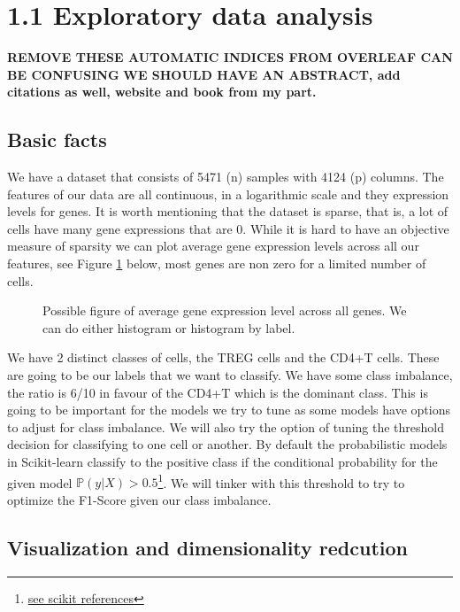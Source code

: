 \documentclass{article}
\begin{document}
\section{1.1 Exploratory data analysis}

\textbf{REMOVE THESE AUTOMATIC INDICES FROM OVERLEAF CAN BE CONFUSING}
\textbf{WE SHOULD HAVE AN ABSTRACT, add citations as well, website and book from my part.}


\subsection{Basic facts}
We have a dataset that consists of 5471 (n) samples with 4124 (p) columns. The features of our data are all continuous, in a logarithmic scale and they expression levels 
for genes. It is worth mentioning that the dataset is sparse, that is, a lot of cells have many gene expressions that are 0. While it is hard to have an objective measure
of sparsity we can plot average gene expression levels across all our features, see Figure \ref{fig:hist_sparse} below, most genes are non zero for a limited number of cells.

\begin{figure}[h]

    
    \caption{Possible figure of average gene expression level across all genes. We can do either histogram or histogram by label.}\label{fig:hist_sparse}
\end{figure}


We have 2 distinct classes of cells, the TREG cells and the 
CD4+T cells. These are going to be our labels that we want to classify. We have some class imbalance, the ratio is 6/10 in favour of the CD4+T 
which is the dominant class. This is going to be important for the models we try to tune as some models have options to adjust for class imbalance.
We will also try the option of tuning the threshold decision for classifying to one cell or another. By default the probabilistic models in Scikit-learn
classify to the positive class if the conditional probability for the given model $\mathbb{P}(\textit{y}|X) > 0.5$\footnote{\href{https://scikit-learn.org/1.5/modules/classification_threshold.html}{see scikit references}}. 
We will tinker with this threshold to try to optimize the F1-Score given our class imbalance.  

\subsection{Visualization and dimensionality redcution}
\end{document}
